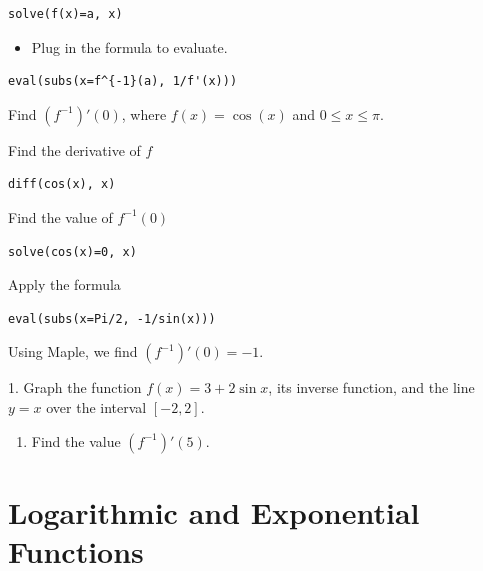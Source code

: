 \documentclass[en,11pt,simple]{elegantbook}
\let\BeginKnitrBlock\begin \let\EndKnitrBlock\end
\begin{document}
\begin{verbatim}
solve(f(x)=a, x)
\end{verbatim}

\begin{itemize}

\item
  Plug in the formula to evaluate.
\end{itemize}

\begin{verbatim}
eval(subs(x=f^{-1}(a), 1/f'(x)))
\end{verbatim}

\BeginKnitrBlock{example}{}{}
\protect\hypertarget{exm:unnamed-chunk-166}{}{\label{exm:unnamed-chunk-166} }Find \((f^{-1})'(0)\), where \(f(x)=\cos(x)\) and \(0\leq x\leq \pi\).
\EndKnitrBlock{example}

\BeginKnitrBlock{solution}{}{}
{}
Find the derivative of \(f\)

\begin{verbatim}
diff(cos(x), x)
\end{verbatim}

Find the value of \(f^{-1}(0)\)

\begin{verbatim}
solve(cos(x)=0, x)
\end{verbatim}

Apply the formula

\begin{verbatim}
eval(subs(x=Pi/2, -1/sin(x)))
\end{verbatim}

Using Maple, we find \((f^{-1})'(0)=-1\).
\EndKnitrBlock{solution}

\BeginKnitrBlock{exercise}{}{}
\protect\hypertarget{exr:unnamed-chunk-168}{}{\label{exr:unnamed-chunk-168} }
1. Graph the function \(f(x)=3+2\sin x\), its inverse function, and the line \(y=x\) over the interval \([-2,2]\).

\begin{enumerate}
\def\labelenumi{\arabic{enumi}.}
\setcounter{enumi}{1}

\item
  Find the value \((f^{-1})'(5)\).
\end{enumerate}
\EndKnitrBlock{exercise}

\hypertarget{logarithmic-and-exponential-functions}{%
\section{Logarithmic and Exponential Functions}\label{logarithmic-and-exponential-functions}}
\end{document}
